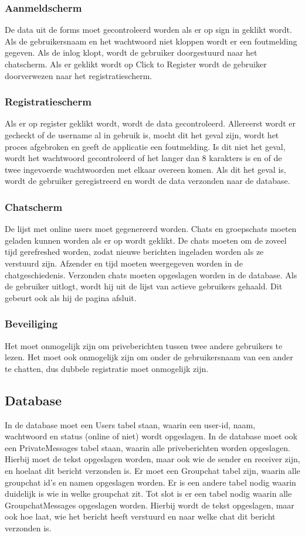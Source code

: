 \documentclass{article}
\begin{document}
\subsubsection*{Aanmeldscherm}
De data uit de forms moet gecontroleerd worden als er op sign in geklikt wordt. Als de gebruikersnaam en het wachtwoord niet kloppen wordt er een foutmelding gegeven. Als de inlog klopt, wordt de gebruiker doorgestuurd naar het chatscherm. 
Als er geklikt wordt op Click to Register wordt de gebruiker doorverwezen naar het registratiescherm.

\subsubsection*{Registratiescherm}
Als er op register geklikt wordt, wordt de data gecontroleerd. 
Allereerst wordt er gecheckt of de username al in gebruik is, mocht dit het geval zijn, wordt het proces afgebroken en geeft de applicatie een foutmelding.
Is dit niet het geval, wordt het wachtwoord gecontroleerd of het langer dan 8 karakters is en of de twee ingevoerde wachtwoorden met elkaar overeen komen. Als dit het geval is, wordt de gebruiker geregistreerd en wordt de data verzonden naar de database. 

\subsubsection*{Chatscherm}
De lijst met online users moet gegenereerd worden.
Chats en groepschats moeten geladen kunnen worden als er op wordt geklikt.
De chats moeten om de zoveel tijd gerefreshed worden, zodat nieuwe berichten ingeladen worden als ze verstuurd zijn.
Afzender en tijd moeten weergegeven worden in de chatgeschiedenis.
Verzonden chats moeten opgeslagen worden in de database.
Als de gebruiker uitlogt, wordt hij uit de lijst van actieve gebruikers gehaald. Dit gebeurt ook als hij de pagina afsluit.

\subsubsection*{Beveiliging}
Het moet onmogelijk zijn om priveberichten tussen twee andere gebruikers te lezen.
Het moet ook onmogelijk zijn om onder de gebruikersnaam van een ander te chatten, dus dubbele registratie moet onmogelijk zijn. 

\subsection*{Database}
In de database moet een Users tabel staan, waarin een user-id, naam, wachtwoord en status (online of niet) wordt opgeslagen.
In de database moet ook een PrivateMessages tabel staan, waarin alle priveberichten worden opgeslagen. Hierbij moet de tekst opgeslagen worden, maar ook wie de sender en receiver zijn, en hoelaat dit bericht verzonden is. 
Er moet een Groupchat tabel zijn, waarin alle groupchat id's en namen opgeslagen worden. Er is een andere tabel nodig waarin duidelijk is wie in welke groupchat zit. 
Tot slot is er een tabel nodig waarin alle GroupchatMessages opgeslagen worden. Hierbij wordt de tekst opgeslagen, maar ook hoe laat, wie het bericht heeft verstuurd en naar welke chat dit bericht verzonden is. 
\end{document}
